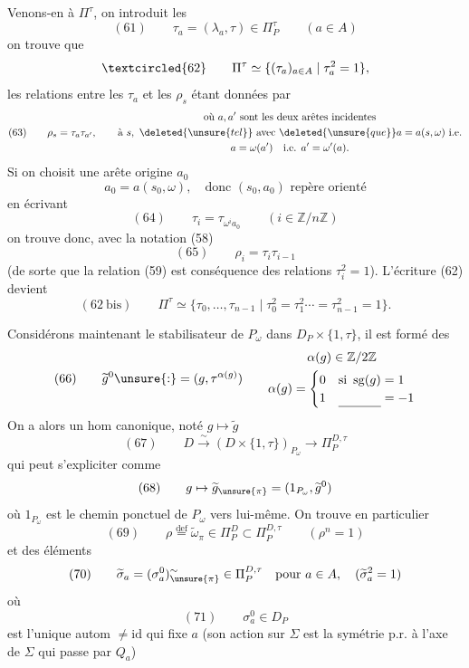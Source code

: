 Venons-en à $\Pi^\tau$, on introduit les
\[
(61)\qquad \tau_a=(\lambda_a,\tau)\in\Pi_P^\tau\qquad(a\in A)
\]
on trouve que
\[
\textcircled{62}\qquad \Pi^\tau\simeq\{(\tau_a)_{a\in A}\mid\tau_a^2=1\},
\]
les relations entre les $\tau_a$ et les $\rho_s$ étant données par
\[
(63)\qquad \rho_s=\tau_a\tau_{a'},\qquad
\begin{gathered}
\text{où }a,a'\text{ sont les deux arêtes incidentes}\\
\text{à }s,\ \deleted{\unsure{tel}}\text{ avec }\deleted{\unsure{que}}a=a(s,\omega)\text{ i.e.}\\
a=\omega(a')\quad\text{i.e. }a'=\omega'(a).
\end{gathered}
\]
Si on choisit  une arête origine $a_0$
\[
a_0=a(s_0,\omega),\quad\text{donc }(s_0,a_0)\text{ repère orienté}
\]
en écrivant
\[
(64)\qquad \tau_i=\tau_{\omega^i a_0}\qquad(i\in\mathbb Z/n\mathbb Z)
\]
on trouve donc, avec la notation (58)
\[
(65)\qquad \rho_i=\tau_i\tau_{i-1}
\]
(de sorte que la relation (59) est conséquence des relations $\tau_i^2=1$). L'écriture (62) devient
\[
(62\ \text{bis})\qquad
\Pi^\tau\simeq\{\tau_0,\ldots,\tau_{n-1}\mid
\tau_0^2=\tau_1^2\cdots=\tau_{n-1}^2=1\}.
\]

Considérons maintenant le stabilisateur de $P_\omega$ dans $D_P\times\{1,\tau\}$, il est formé des
\[
(66)\qquad
\widetilde g^0\unsure{:}= (g,\tau^{\alpha(g)})
\qquad
\begin{gathered}
\alpha(g)\in\mathbb Z/2\mathbb Z\\
\alpha(g)=
\begin{cases}
0&\text{si }\operatorname{sg}(g)=1\\
1&\underline{\phantom{\text{si }\operatorname{sg}(g)}}=-1
\end{cases}
\end{gathered}
\]
On a alors un hom canonique,  noté $g\mapsto\widetilde g$ 
\[
(67)\qquad D\xrightarrow{\sim}(D\times\{1,\tau\})_{P_\omega}
\longrightarrow\Pi_P^{D,\tau}
\]
qui peut s'expliciter comme
\[
(68)\qquad g\mapsto\widetilde g_{\unsure{\pi}}=(1_{P_\omega},\widetilde g^0)
\]
où $1_{P_\omega}$ est le chemin  ponctuel de $P_\omega$ vers lui-même.
On trouve en particulier
\[
(69)\qquad \rho\overset{\mathrm{def}}=\widetilde\omega_\pi\in\Pi_P^D\subset\Pi_P^{D,\tau}
\qquad(\rho^n=1)
\]
et des éléments
\[
(70)\qquad \widetilde\sigma_a=(\sigma_a^0)^{\sim}_{\unsure{\pi}}\in\Pi_P^{D,\tau}
\quad\text{pour }a\in A,\quad(\widetilde\sigma_a^2=1)
\]
où
\[
(71)\qquad \sigma_a^0\in D_P
\]
est l'unique autom $\ne\mathrm{id}$ qui fixe $a$ (son action sur $\Sigma$ est la symétrie p.r. à l'axe de $\Sigma$ qui passe par $Q_a$)

